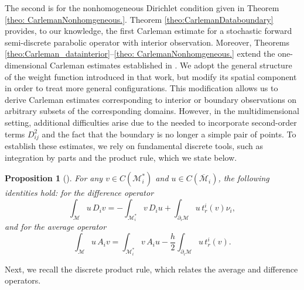 \documentclass[11pt,oneside,leqno]{amsart}
\numberwithin{equation}{section}
\numberwithin{equation}{section}
\newtheorem{proposition}[theorem]{Proposition}
\begin{document}
The second is for the nonhomogeneous Dirichlet condition given in Theorem \ref{theo: CarlemanNonhomgeneous.}. { Theorem \ref{theo:CarlemanDataboundary} provides, to our knowledge, the first Carleman estimate for a stochastic forward semi-discrete parabolic operator with interior observation. Moreover, Theorems \ref{theo:Carleman_datainterior}--\ref{theo: CarlemanNonhomgeneous.} extend the one-dimensional Carleman estimates established in \cite{WWW:2024}. We adopt the general structure of the weight function introduced in that work, but modify its spatial component in order to treat more general configurations. This modification allows us to derive Carleman estimates corresponding to interior or boundary observations on arbitrary subsets of the corresponding domains.
}However, in the multidimensional setting, additional difficulties arise due to the needed to incorporate second-order terms $D^{2}_{ij}$ and the fact that the boundary is no longer a simple pair of points. To establish these estimates, we rely on fundamental discrete tools, such as integration by parts and the product rule, which we state below.

\begin{proposition}[{\cite[Lemma 2.2]{LOPD:2023}}]\label{prop:integralbyparts}
For any $v\in C(\mathcal{M}_{i}^{\ast})$ and $u\in C(\overline{\mathcal{M}}_{i})$, the following identities hold: for the difference operator
\begin{equation}\label{eq:int:dif}
    \int_{\mathcal{M}}u\,D_{i}v=-\int_{\mathcal{M}_{i}^{\ast}}v\,D_{i}u+\int_{\partial_{i}\mathcal{M}}u\,t_{r}^{i}(v)\nu_{i},
\end{equation}    
and for the average operator
\begin{equation}\label{eq:int:ave}
\int_{\mathcal{M}}u\,A_{i}v=\int_{\mathcal{M}_{i}^{\ast}}v\,A_{i}u-\frac{h}{2}\int_{\partial_{i} \mathcal{M}}u\,t_{r}^{i}(v).
\end{equation}
\end{proposition}

Next, we recall the discrete product rule, which relates the average and difference operators.
\end{document}

